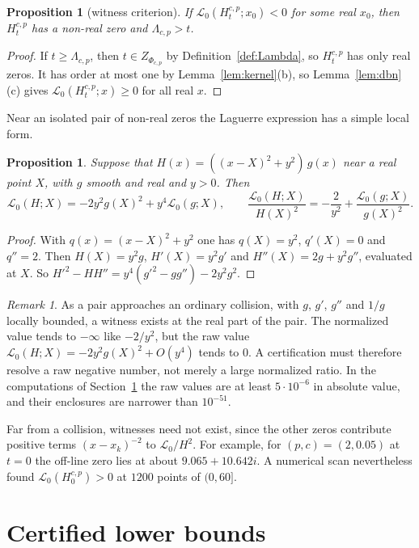 \documentclass[11pt]{article}
\numberwithin{equation}{section}
\newtheorem{proposition}[theorem]{Proposition}
\theoremstyle{definition}
\theoremstyle{remark}
\newtheorem{remark}[theorem]{Remark}
\newcommand{\Lag}{\mathscr L_0}
\begin{document}
\begin{proposition}[witness criterion]\label{prop:witness}
If $\Lag(H^{c,p}_t;x_0)<0$ for some real $x_0$, then $H^{c,p}_t$ has a
non-real zero and $\Lambda_{c,p}>t$.
\end{proposition}

\begin{proof}
If $t\ge\Lambda_{c,p}$, then $t\in Z_{\Phi_{c,p}}$ by
Definition~\ref{def:Lambda}, so $H^{c,p}_t$ has only real zeros. It has
order at most one by Lemma~\ref{lem:kernel}(b), so
Lemma~\ref{lem:dbn}(c) gives $\Lag(H^{c,p}_t;x)\ge0$ for all real $x$.
\end{proof}

Near an isolated pair of non-real zeros the Laguerre expression has a simple
local form.

\begin{proposition}\label{prop:local}
Suppose that $H(x)=((x-X)^2+y^2)\,g(x)$ near a real point $X$, with $g$
smooth and real and $y>0$. Then
\[
\Lag(H;X)=-2y^2g(X)^2+y^4\Lag(g;X),\qquad
\frac{\Lag(H;X)}{H(X)^2}=-\frac2{y^2}+\frac{\Lag(g;X)}{g(X)^2}.
\]
\end{proposition}

\begin{proof}
With $q(x)=(x-X)^2+y^2$ one has $q(X)=y^2$, $q'(X)=0$ and $q''=2$. Then
$H(X)=y^2g$, $H'(X)=y^2g'$ and $H''(X)=2g+y^2g''$, evaluated at $X$. So
$H'^2-HH''=y^4(g'^2-gg'')-2y^2g^2$.
\end{proof}

\begin{remark}\label{rem:margin}
As a pair approaches an ordinary collision, with $g$, $g'$, $g''$ and $1/g$
locally bounded, a witness exists at the real part of the pair. The
normalized value tends to $-\infty$ like $-2/y^2$, but the raw value
$\Lag(H;X)=-2y^2g(X)^2+O(y^4)$ tends to $0$. A certification must therefore
resolve a raw negative number, not merely a large normalized ratio. In the
computations of Section~\ref{sec:certified} the raw values are at least
$5\cdot10^{-6}$ in absolute value, and their enclosures are narrower than
$10^{-51}$.

Far from a collision, witnesses need not exist, since the other zeros
contribute positive terms $(x-x_k)^{-2}$ to $\Lag/H^2$. For example,
for $(p,c)=(2,0.05)$ at $t=0$ the off-line zero lies at about
$9.065+10.642i$. A numerical scan nevertheless found $\Lag(H^{c,p}_0)>0$
at $1200$ points of $(0,60]$.
\end{remark}

\section{Certified lower bounds}\label{sec:certified}
\end{document}

